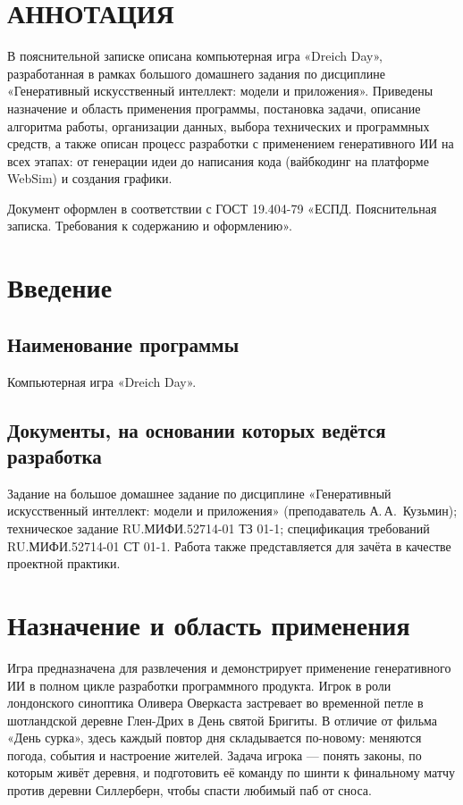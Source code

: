 \documentclass[12pt]{article}
\begin{document}

\section*{\centering АННОТАЦИЯ}
В пояснительной записке описана компьютерная игра «Dreich Day», разработанная в рамках большого домашнего задания по дисциплине «Генеративный искусственный интеллект: модели и приложения». Приведены назначение и область применения программы, постановка задачи, описание алгоритма работы, организации данных, выбора технических и программных средств, а также описан процесс разработки с применением генеративного ИИ на всех этапах: от генерации идеи до написания кода (вайбкодинг на платформе WebSim) и создания графики.

Документ оформлен в соответствии с ГОСТ 19.404-79 «ЕСПД. Пояснительная записка. Требования к содержанию и оформлению».
\clearpage
\tableofcontents
\clearpage

\section{Введение}
\subsection{Наименование программы}
Компьютерная игра «Dreich Day».
\subsection{Документы, на основании которых ведётся разработка}
Задание на большое домашнее задание по дисциплине «Генеративный искусственный интеллект: модели и приложения» (преподаватель А.\,А.~Кузьмин); техническое задание RU.МИФИ.52714-01 ТЗ 01-1; спецификация требований RU.МИФИ.52714-01 СТ 01-1. Работа также представляется для зачёта в качестве проектной практики.

\section{Назначение и область применения}
Игра предназначена для развлечения и демонстрирует применение генеративного ИИ в полном цикле разработки программного продукта. Игрок в роли лондонского синоптика Оливера Оверкаста застревает во временной петле в шотландской деревне Глен-Дрих в День святой Бригиты. В отличие от фильма «День сурка», здесь каждый повтор дня складывается по-новому: меняются погода, события и настроение жителей. Задача игрока — понять законы, по которым живёт деревня, и подготовить её команду по шинти к финальному матчу против деревни Силлерберн, чтобы спасти любимый паб от сноса.
\end{document}
